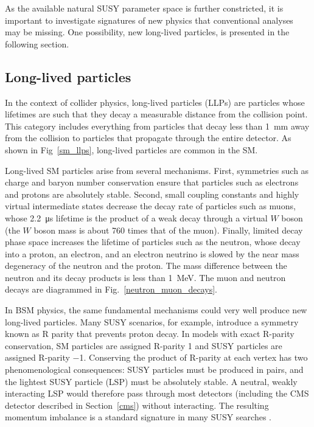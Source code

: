 

As the available natural SUSY parameter space is further constricted, it is important to investigate signatures of new physics that conventional analyses may be missing. One possibility, new long-lived particles, is presented in the following section.


\subsection{Long-lived particles}
\label{llps}
In the context of collider physics, long-lived particles (LLPs) are particles whose lifetimes are such that they decay a measurable distance from the collision point. This category includes everything from particles that decay less than \SI{1}{\mm} away from the collision to particles that propagate through the entire detector. As shown in Fig~\ref{sm_llps}, long-lived particles are common in the SM.



Long-lived SM particles arise from several mechanisms. First, symmetries such as charge and baryon number conservation ensure that particles such as electrons and protons are absolutely stable. Second, small coupling constants and highly virtual intermediate states decrease the decay rate of particles such as muons, whose \SI{2.2}{\us} lifetime is the product of a weak decay through a virtual $W$ boson (the $W$ boson mass is about \num{760} times that of the muon). Finally, limited decay phase space increases the lifetime of particles such as the neutron, whose decay into a proton, an electron, and an electron neutrino is slowed by the near mass degeneracy of the neutron and the proton. The mass difference between the neutron and its decay products is less than \SI{1}{\MeV}. The muon and neutron decays are diagrammed in Fig.~\ref{neutron_muon_decays}.



In BSM physics, the same fundamental mechanisms could very well produce new long-lived particles. Many SUSY scenarios, for example, introduce a symmetry known as R parity that prevents proton decay. In models with exact R-parity conservation, SM particles are assigned R-parity \num{+1} and SUSY particles are assigned R-parity \num{-1}. Conserving the product of R-parity at each vertex has two phenomenological consequences: SUSY particles must be produced in pairs, and the lightest SUSY particle (LSP) must be absolutely stable. A neutral, weakly interacting LSP would therefore pass through most detectors (including the CMS detector described in Section~\ref{cms}) without interacting. The resulting momentum imbalance is a standard signature in many SUSY searches \cite{pdg_2020}.

